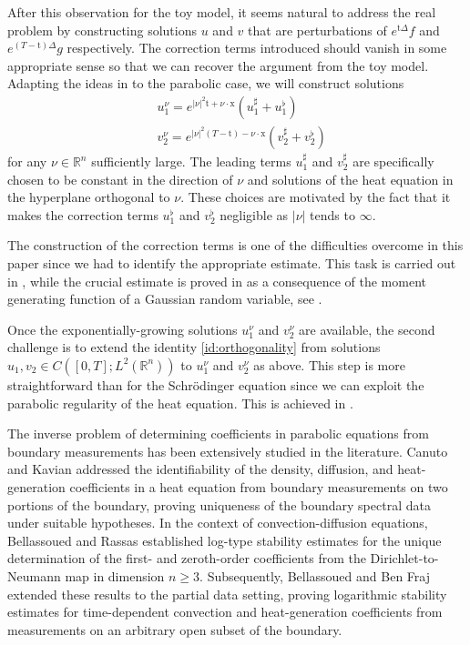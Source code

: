 \documentclass[10pt,a4paper]{amsart}
\theoremstyle{remark}
\theoremstyle{definition}
\newcommand{\R}{\mathbb{R}}
\newcommand{\tm}{\mathrm{t}}
\newcommand{\x}{\mathrm{x}}
\begin{document}
After this observation for the toy model, it seems natural to address the real problem
by constructing solutions $u$ and $v$ that are perturbations of $e^{\tm \Delta}f$ and 
$e^{(T - \tm) \Delta}g$ respectively. The correction terms introduced should vanish in some 
appropriate sense so that we can recover the argument from the toy model. Adapting the ideas in 
\cite{zbMATH07801151} to the parabolic case, we will construct solutions
\begin{align*}
& u_1^\nu = e^{|\nu|^2 \tm + \nu \cdot \x} (u_1^\sharp + u_1^\flat)\\
& v_2^\nu = e^{|\nu|^2 (T - \tm) - \nu \cdot \x} (v_2^\sharp + v_2^\flat)
\end{align*}
for any $\nu \in \R^n $ sufficiently large. The leading terms $u_1^\sharp$ and $v_2^\sharp$ are
specifically chosen to be constant in the direction of $\nu$ and solutions of the heat equation in 
the hyperplane orthogonal to $\nu$. These choices are motivated by the fact that it makes the 
correction terms $u_1^\flat$ and $v_2^\flat$ negligible as $|\nu| $ tends to $ \infty$.

The construction of the correction terms is one of the difficulties overcome in this paper since we 
had to identify the appropriate estimate. This task is carried out in , while the
crucial estimate is proved in  as a consequence of 
the moment generating function of a Gaussian random variable, see .

Once the exponentially-growing solutions $u_1^\nu$ and $v_2^\nu$ are available,
the second challenge is to extend the identity \eqref{id:orthogonality} from solutions 
$u_1, v_2 \in C([0,T]; L^2(\R^n))$ to $u_1^\nu$ and $v_2^\nu$ as above.
This step is more straightforward than for the Schrödinger equation since we can exploit the 
parabolic regularity of the heat equation. This is achieved in .

The inverse problem of determining coefficients in parabolic equations from boundary measurements has been extensively studied in the literature. Canuto and Kavian \cite{zbMATH01578850} addressed the identifiability of the density, diffusion, and heat-generation coefficients in a heat equation from boundary measurements on two portions of the boundary, proving uniqueness of the boundary spectral data under suitable hypotheses. In the context of convection-diffusion equations, Bellassoued and Rassas \cite{zbMATH07173395} established log-type stability estimates for the unique determination of the first- and zeroth-order coefficients from the Dirichlet-to-Neumann map in dimension $n \geq 3$. Subsequently, Bellassoued and Ben Fraj \cite{zbMATH07335388} extended these results to the partial data setting, proving logarithmic stability estimates for time-dependent convection and heat-generation coefficients from measurements on an arbitrary open subset of the boundary.
\end{document}
